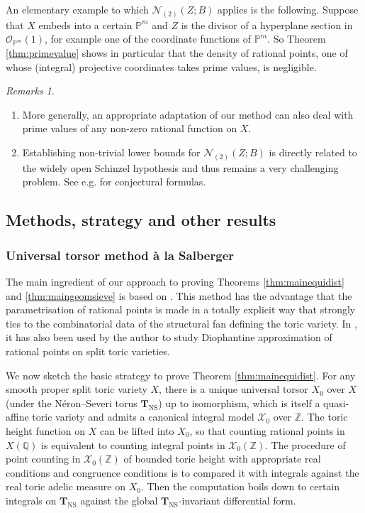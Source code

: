 \documentclass[11pt,letterpaper]{amsart}
\newcommand{\BP}{{\mathbb {P}}}
\newcommand{\BQ}{{\mathbb {Q}}}
\newcommand{\BZ}{{\mathbb {Z}}}
\newcommand{\CN}{{\mathcal {N}}}
\newcommand{\CO}{{\mathcal {O}}}
\newcommand{\CX}{{\mathcal {X}}}
\newcommand{\CTNS}{\mathbf{T}_{\operatorname{NS}}}
\theoremstyle{plain}
\numberwithin{equation}{section}
\theoremstyle{definition}
\theoremstyle{remark}
\newtheorem{remarks}[theorem]{Remarks}
\begin{document}
An elementary example to which $\CN_{(2)}(Z;B)$ applies is the following. Suppose that $X$ embeds into a certain $\BP^m$ and $Z$ is the divisor  of a hyperplane section in $\CO_{\BP^m}(1)$, for example one of the coordinate functions of $\BP^m$. So Theorem \ref{thm:primevalue} shows in particular that the density of rational points, one of whose (integral) projective coordinates takes prime values, is negligible.
\begin{remarks}
	\hfill
	\begin{enumerate}
		\item More generally, an appropriate adaptation of our method can also deal with prime values of any non-zero rational function on $X$.
		\item Establishing non-trivial lower bounds for $\CN_{(2)}(Z;B)$ is directly related to the widely open Schinzel hypothesis and thus remains a very challenging problem. See e.g. \cite[p. 362]{Nevo-Sarnak} for conjectural formulas.
	\end{enumerate}
\end{remarks}
\subsection{Methods, strategy and other results} 
\subsubsection{Universal torsor method à la Salberger} 
The main ingredient of our approach to proving Theorems \ref{thm:mainequidist} and \ref{thm:maingeomsieve} is based on \cite{Salberger}. This method has the advantage that the parametrisation of rational points is made in a totally explicit way that strongly ties to the combinatorial data of the structural fan defining the toric variety. In \cite{Huang}, it has also been used by the author to study Diophantine approximation of rational points on split toric varieties. 

 We now sketch the basic strategy to prove Theorem \ref{thm:mainequidist}. For any smooth proper split toric variety $X$, there is a unique universal torsor $X_0$ over $X$ (under the Néron--Severi torus $\CTNS$) up to isomorphism, which is itself a quasi-affine toric variety and admits a canonical integral model $\CX_0$ over $\BZ$. The toric height function on $X$ can be lifted into $X_0$, so that counting rational points in $X(\BQ)$ is equivalent to counting integral points in $\CX_0(\BZ)$.  The  procedure of point counting in $\CX_0(\BZ)$ of bounded toric height with appropriate real conditions and congruence conditions is to compared it with integrals against the real toric adelic measure on $X_0$. Then the computation boils down to certain integrals on $\CTNS$ against the global $\CTNS$-invariant differential form.
\end{document}

